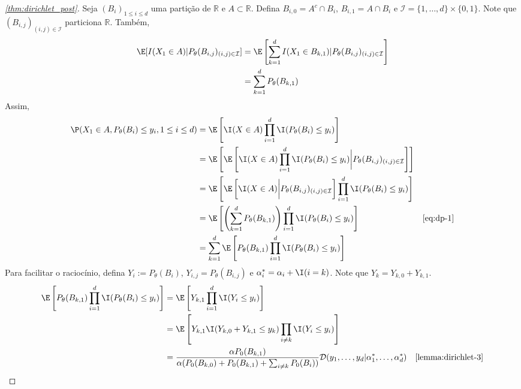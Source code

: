 \begin{proof}[\cref{thm:dirichlet_post}]
 Seja $(B_i)_{1 \leq i \leq d}$
 uma partição de $\mathbb{R}$ e
 $A \subset \mathbb{R}$.
 Defina $B_{i,0} = A^c \cap B_i$,
 $B_{i,1} = A \cap B_i$ e
 $\mathcal{I} = \{1,\ldots,d\} \times \{0,1\}$.
 Note que
 $(B_{i,j})_{(i,j) \in \mathcal{I}}$
 particiona $\mathbb{R}$. Também,
 \begin{align}
  \label{eq:dp-1} 
  \E[I(X_1 \in A)|P_{\theta}(B_{i,j})_{(i,j) \in \mathcal{I}}]
  &= \E\left[\sum_{k=1}^{d} I(X_1 \in B_{k,1})
  |P_{\theta}(B_{i,j})_{(i,j) \in \mathcal{I}}\right] 
  \nonumber \\
  &= \sum_{k=1}^{d}P_{\theta}(B_{k,1})
 \end{align}
 Assim,
 \begin{align}
  \label{eq:dp-post-1}
  \P(X_1 \in A, P_{\theta}(B_{i}) \leq y_{i},
  1 \leq i \leq d)
  &= \E\left[\I(X \in A) \prod_{i=1}^d
  \I(P_{\theta}(B_{i}) \leq y_{i}) \right] 
  \nonumber \\
  &= \E\left[\E\left[\I(X \in A) 
  \prod_{i=1}^d
  \I(P_{\theta}(B_{i}) \leq y_{i}) \bigg|
  P_{\theta}(B_{i,j})_{(i,j) \in \mathcal{I}}
  \right]\right]
  \nonumber \\
  &= \E\left[\E\left[\I(X \in A) \bigg|
  P_{\theta}(B_{i,j})_{(i,j) \in \mathcal{I}} \right]
  \prod_{i=1}^d 
  \I(P_{\theta}(B_{i}) \leq y_{i})\right]
  \nonumber \\
  &= \E\left[
  \left(\sum_{k=1}^{d}P_{\theta}(B_{k,1})\right)
  \prod_{i=1}^d
  \I(P_{\theta}(B_{i}) \leq y_{i})\right]
  & \text{\cref{eq:dp-1}} \nonumber \\
  &= \sum_{k=1}^{d}\E\left[P_{\theta}(B_{k,1})
  \prod_{i=1}^d \I(P_{\theta}(B_{i}) \leq y_{i})\right]
 \end{align}
 Para facilitar o raciocínio,
 defina $Y_i := P_{\theta}(B_{i})$,
 $Y_{i,j} = P_{\theta}(B_{i,j})$ e
 $\alpha_i^* = \alpha_i + \I(i=k)$. 
 Note que $Y_k = Y_{k,0} + Y_{k,1}$.
 \begin{align}
  \label{eq:dp-post-2}
  \E\left[P_{\theta}(B_{k,1})
  \prod_{i=1}^d \I(P_{\theta}(B_{i}) \leq y_{i})\right]
  &= \E\left[Y_{k,1} 
  \prod_{i=1}^d \I(Y_i \leq y_{i})\right] 
  \nonumber \\
  &= \E\left[Y_{k,1} \I(Y_{k,0}+Y_{k,1} \leq y_k)
  \prod_{i \neq k} \I(Y_i \leq y_{i})\right] 
  \nonumber \\
  &= \frac{\alpha P_0(B_{k,1})}
  {\alpha(P_0(B_{k,0})+P_0(B_{k,1})+\sum_{i\neq k}P_0(B_{i}))}
  \mathcal{D}(y_1,\ldots,y_{d}|\alpha^*_1,\ldots,\alpha^*_d)
  & \text{\cref{lemma:dirichlet-3}} 

\end{align}
\end{proof}
